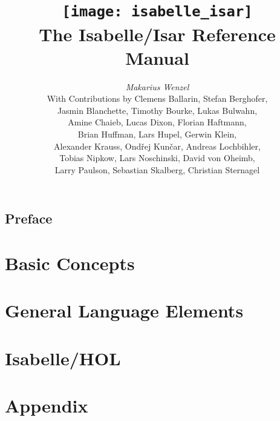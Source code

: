 \documentclass[12pt,a4paper,fleqn]{report}
\title{\texttt{[image: isabelle\_isar]} \\[4ex] The Isabelle/Isar Reference Manual}
\author{\emph{Makarius Wenzel} \\[3ex]
  With Contributions by
  Clemens Ballarin,
  Stefan Berghofer, \\
  Jasmin Blanchette,
  Timothy Bourke,
  Lukas Bulwahn, \\
  Amine Chaieb,
  Lucas Dixon,
  Florian Haftmann, \\
  Brian Huffman,
  Lars Hupel,
  Gerwin Klein, \\
  Alexander Krauss,
  Ond\v{r}ej Kun\v{c}ar,
  Andreas Lochbihler, \\
  Tobias Nipkow,
  Lars Noschinski,
  David von Oheimb, \\
  Larry Paulson,
  Sebastian Skalberg,
  Christian Sternagel
}
\let\intorig=\int  %
\begin{document}
\maketitle 

\chapter*{Preface}

\tableofcontents
\clearfirst

\part{Basic Concepts}



\part{General Language Elements}







\part{Isabelle/HOL}\label{part:hol}


\part{Appendix}
\appendix

\let\int\intorig



\begingroup
  \tocentry{\bibname}
   \small\raggedright\frenchspacing
  
\endgroup

\tocentry{\indexname}
\printindex
\end{document}
